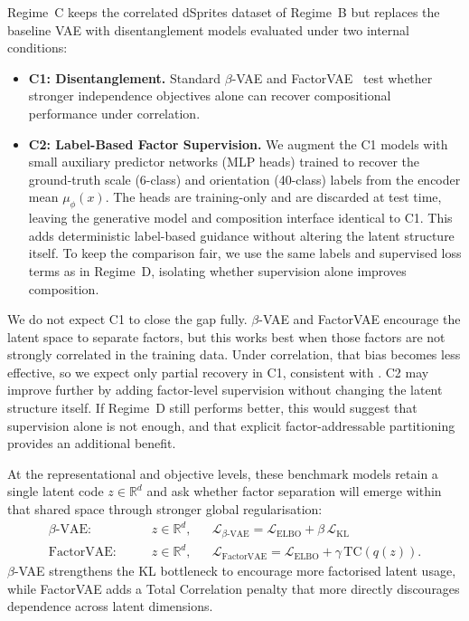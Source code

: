 Regime~C keeps the correlated dSprites dataset of Regime~B but replaces the baseline VAE with disentanglement models evaluated under two internal conditions:
\begin{itemize}
    \item \textbf{C1: Disentanglement.} Standard $\beta$-VAE \citep{Higgins2016betaVAELB} and
    FactorVAE~\citep{disentangling_by_factorising} test whether stronger independence
    objectives alone can recover compositional performance under correlation.
    \item \textbf{C2: Label-Based Factor Supervision.} We augment the C1 models with small
    auxiliary predictor networks (MLP heads) trained to recover the ground-truth scale (6-class)
    and orientation (40-class) labels from the encoder mean $\mu_\phi(x)$. The heads are
    training-only and are discarded at test
    time, leaving the generative model and composition interface identical to C1. This adds
    deterministic label-based guidance without altering the latent structure itself. To keep the
    comparison fair, we use the same labels and supervised loss terms as in Regime~D, isolating
    whether supervision alone improves composition.
\end{itemize}
We do not expect C1 to close the gap fully. 
$\beta$-VAE and FactorVAE encourage the latent space to separate factors, but this works best when those factors are not strongly correlated in the training data. 
Under correlation, that bias becomes less effective, so we expect only partial recovery in C1, consistent with \citet{traeuble2021disentangled}. 
C2 may improve further by adding factor-level supervision without changing the latent structure itself. 
If Regime~D still performs better, this would suggest that supervision alone is not enough, and that explicit factor-addressable partitioning provides an additional benefit.

At the representational and objective levels, these benchmark models retain a single latent code
$z \in \mathbb{R}^{d}$ and ask whether factor separation will emerge within that shared space
through stronger global regularisation:
\begin{equation}
\begin{aligned}
\text{$\beta$-VAE:}\qquad
& z \in \mathbb{R}^{d},
&& \mathcal{L}_{\beta\text{-VAE}}
= \mathcal{L}_{\mathrm{ELBO}} + \beta\,\mathcal{L}_{\mathrm{KL}}
\\[4pt]
\text{FactorVAE:}\qquad
& z \in \mathbb{R}^{d},
&& \mathcal{L}_{\mathrm{FactorVAE}}
= \mathcal{L}_{\mathrm{ELBO}} + \gamma\,\mathrm{TC}(q(z)).
\end{aligned}
\end{equation}
$\beta$-VAE
strengthens the KL bottleneck to encourage more factorised latent usage, while FactorVAE adds a
Total Correlation penalty that more directly discourages dependence across latent dimensions.

